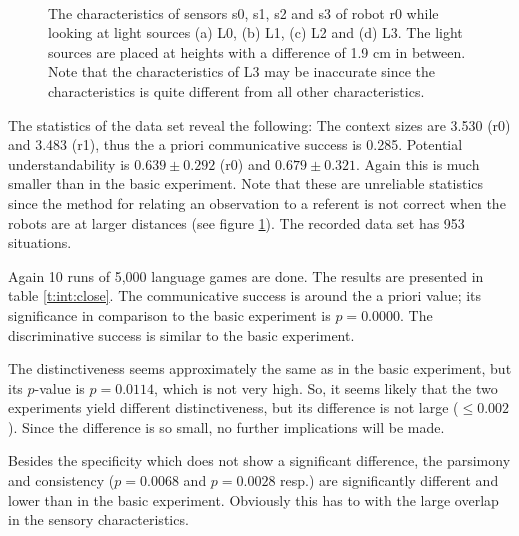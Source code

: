 \begin{figure}
\\
\caption{The characteristics of sensors s0, s1, s2 and s3 of robot r0 while looking at light sources (a) L0, (b) L1, (c) L2 and (d) L3. The light sources are placed at heights with a difference of 1.9 cm in between. Note that the characteristics of L3 may be inaccurate since the characteristics is quite different from all other characteristics.}
\label{f:int:calibration}
\end{figure}

\p
The statistics of the data set reveal the following: The context sizes are 3.530 (r0) and 3.483 (r1), thus the a priori communicative success is 0.285. Potential understandability is $0.639\pm 0.292$ (r0) and $0.679 \pm 0.321$. Again this is much smaller than in the basic experiment. Note that these are unreliable statistics since the method for relating an observation to a referent is not correct when the robots are at larger distances (see figure \ref{f:int:calibration}). The recorded data set has 953 situations.

Again 10 runs of 5,000 language games are done. The results are presented in table \ref{t:int:close}. The communicative success is around the a priori value; its significance in comparison to the basic experiment is $p=0.0000$. The discriminative success is similar to the basic experiment. 

The distinctiveness seems approximately the same as in the basic experiment, but its $p$-value is $p=0.0114$, which is not very high. So, it seems likely that the two experiments yield different distinctiveness, but its difference is not large ($\leq 0.002$). Since the difference is so small, no further implications will be made.

Besides the specificity which does not show a significant difference, the parsimony and consistency ($p=0.0068$ and $p=0.0028$ resp.) are significantly different and lower than in the basic experiment. Obviously this has to with the large overlap in the sensory characteristics.


